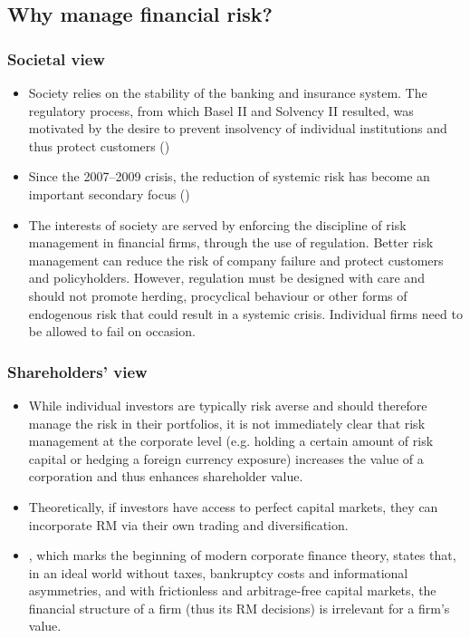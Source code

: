 \subsection*{Why manage financial risk?}
\subsubsection*{Societal view}
\begin{itemize}[leftmargin=*]
    \item Society relies on the stability of the banking and insurance system. The regulatory process, from which Basel II and Solvency II resulted, was motivated by the desire to prevent insolvency of individual institutions and thus protect customers ()
    \item Since the 2007–2009 crisis, the reduction of systemic risk has become an important secondary focus ()
    \item The interests of society are served by enforcing the discipline of risk management in financial firms, through the use of regulation. Better risk management can reduce the risk of company failure and protect customers and policyholders. However, regulation must be designed with care and should not promote herding, procyclical behaviour or other forms of endogenous risk that could result in a systemic crisis. Individual firms need to be allowed to fail on occasion.
\end{itemize}

\subsubsection*{Shareholders’ view}
\begin{itemize}[leftmargin=*]
    \item While individual investors are typically risk averse and should therefore manage the risk in their portfolios, it is not immediately clear that risk management at the corporate level (e.g. holding a certain amount of risk capital or hedging a foreign currency exposure) increases the value of a corporation and thus enhances shareholder value.
    \item Theoretically, if investors have access to perfect capital markets, they can incorporate RM via their own trading and diversification.
    \item {}, which marks the beginning of modern corporate finance theory, states that, in an ideal world without taxes, bankruptcy costs and informational asymmetries, and with frictionless and arbitrage-free capital markets, the financial structure of a firm (thus its RM decisions) is irrelevant for a firm’s value.
\end{itemize}


